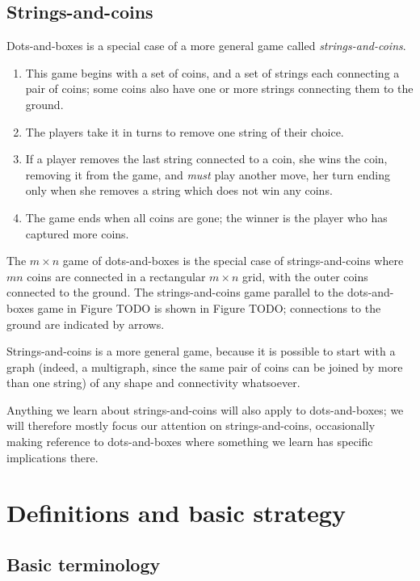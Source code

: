 \documentclass[a4paper,twocolumn]{article}
\begin{document}
\subsection{Strings-and-coins}

Dots-and-boxes is a special case of a more general game called
\emph{strings-and-coins}.

\begin{enumerate}
  \item This game begins with a set of coins, and a set of strings
    each connecting a pair of coins; some coins also have one or more
    strings connecting them to the ground.
  \item The players take it in turns to remove one string of their
    choice.
  \item If a player removes the last string connected to a coin, she
    wins the coin, removing it from the game, and \emph{must} play
    another move, her turn ending only when she removes a string which
    does not win any coins.
  \item The game ends when all coins are gone; the winner is the
    player who has captured more coins.
\end{enumerate}

The $m \times n$ game of dots-and-boxes is the special case of
strings-and-coins where $mn$ coins are connected in a rectangular $m
\times n$ grid, with the outer coins connected to the ground. The
strings-and-coins game parallel to the dots-and-boxes game in Figure
TODO is shown in Figure TODO; connections to the ground are indicated
by arrows.

Strings-and-coins is a more general game, because it is possible to
start with a graph (indeed, a multigraph, since the same pair of coins
can be joined by more than one string) of any shape and connectivity
whatsoever.

Anything we learn about strings-and-coins will also apply to
dots-and-boxes; we will therefore mostly focus our attention on
strings-and-coins, occasionally making reference to dots-and-boxes
where something we learn has specific implications there.

\section{Definitions and basic strategy}

\subsection{Basic terminology}
\end{document}
